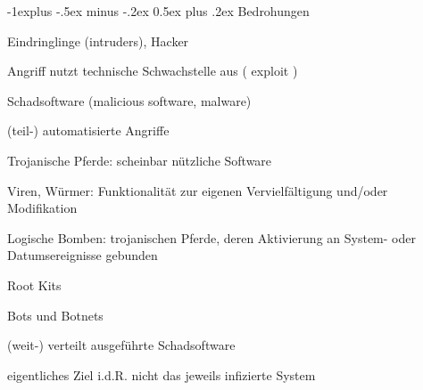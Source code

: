 \documentclass[a4paper]{article}
\makeatletter
\renewcommand{\subsection}{\@startsection{subsection}{2}{0mm}%
 {-1explus -.5ex minus -.2ex}%
 {0.5ex plus .2ex}%
 {\normalfont\normalsize\bfseries}}
\makeatother
\begin{document}
\begin{multicols}{3}
    \subsection{Bedrohungen}
    \begin{enumerate*}
        \item Eindringlinge (intruders), Hacker
        \begin{itemize*}
            \item Angriff nutzt technische Schwachstelle aus ( exploit )
        \end{itemize*}
        \item Schadsoftware (malicious software, malware)
        \begin{itemize*}
            \item (teil-) automatisierte Angriffe
            \item Trojanische Pferde: scheinbar nützliche Software
            \item Viren, Würmer: Funktionalität zur eigenen Vervielfältigung und/oder Modifikation
            \item Logische Bomben: trojanischen Pferde, deren Aktivierung an System- oder Datumsereignisse gebunden
            \item Root Kits
        \end{itemize*}
        \item Bots und Botnets
        \begin{itemize*}
            \item (weit-) verteilt ausgeführte Schadsoftware
            \item eigentliches Ziel i.d.R. nicht das jeweils infizierte System
        \end{itemize*}
    \end{enumerate*}


\end{multicols}
\end{document}
